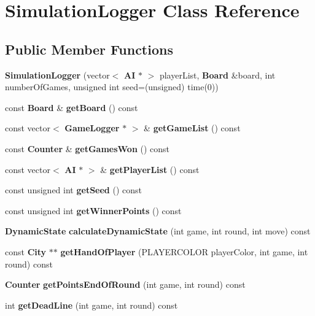 \section{Simulation\-Logger Class Reference}
\label{class_simulation_logger}
\subsection*{Public Member Functions}
\begin{DoxyCompactItemize}
\item 
{\bfseries Simulation\-Logger} (vector$<$ {\bf A\-I} $\ast$ $>$ player\-List, {\bf Board} \&board, int number\-Of\-Games, unsigned int seed=(unsigned) time(0))\label{class_simulation_logger_a1bd6ad9e03211cee83757c567c14195b}

\item 
const {\bf Board} \& {\bfseries get\-Board} () const \label{class_simulation_logger_a5ed89aaa870ff9323be5f8f82da95f4a}

\item 
const vector$<$ {\bf Game\-Logger} $\ast$ $>$ \& {\bfseries get\-Game\-List} () const \label{class_simulation_logger_af92f6d16f918a385ccfa0d9b6a8823b3}

\item 
const {\bf Counter} \& {\bfseries get\-Games\-Won} () const \label{class_simulation_logger_a1a8d238597cef51d85bef2cd397bfb4d}

\item 
const vector$<$ {\bf A\-I} $\ast$ $>$ \& {\bfseries get\-Player\-List} () const \label{class_simulation_logger_ac089019f8358d4bb5bb5d92504e40ca4}

\item 
const unsigned int {\bfseries get\-Seed} () const \label{class_simulation_logger_ac9f1225d9d932eb90ccdde1c4149d212}

\item 
const unsigned int {\bfseries get\-Winner\-Points} () const \label{class_simulation_logger_af90bd066ae1f1012384f87662f19eb8f}

\item 
{\bf Dynamic\-State} {\bfseries calculate\-Dynamic\-State} (int game, int round, int move) const \label{class_simulation_logger_a1929c74a77d05af475b262b65acc4258}

\item 
const {\bf City} $\ast$$\ast$ {\bfseries get\-Hand\-Of\-Player} (P\-L\-A\-Y\-E\-R\-C\-O\-L\-O\-R player\-Color, int game, int round) const \label{class_simulation_logger_ac063a9256c51c6b52a0684392615f7bc}

\item 
{\bf Counter} {\bfseries get\-Points\-End\-Of\-Round} (int game, int round) const \label{class_simulation_logger_acba8730ff613b90317ab11723a1db404}

\item 
int {\bfseries get\-Dead\-Line} (int game, int round) const \label{class_simulation_logger_a5f57d92ada730f8ba5c45901db916035}

\end{DoxyCompactItemize}
